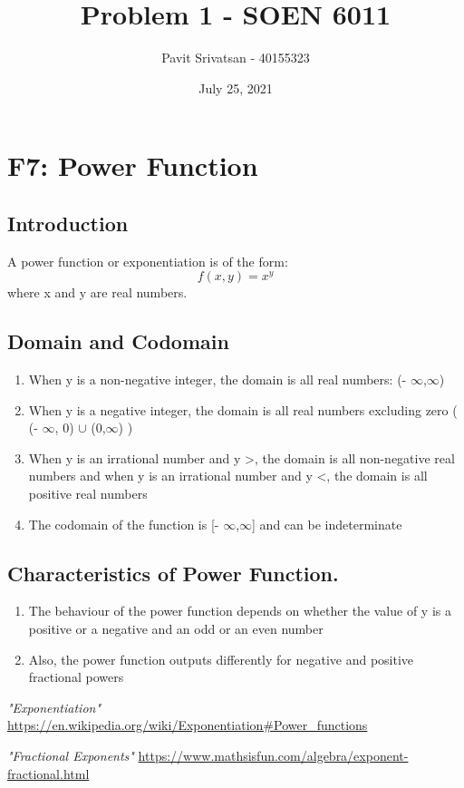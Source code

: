 \documentclass{article}
\title{Problem 1 - SOEN 6011}
\author{Pavit Srivatsan - 40155323}
\date{July 25, 2021}
\begin{document}
\maketitle

\section*{F7: Power Function}
\subsection{Introduction}
A power function or exponentiation is of the form:\[ f(x,y) = x^y \] where x and y are real numbers.
\subsection{Domain and Codomain}
\begin{enumerate}
\item When y is a non-negative integer, the domain is all real numbers:  (- $\infty$,$\infty$)

\item When y is a negative integer, the domain is all real numbers excluding zero ( (- $\infty$, 0) $\cup$ (0,$\infty$) )

\item When y is an irrational number and y \textgreater {}, the domain is all non-negative real numbers and when y is an irrational number and y \textless {}, the domain is all positive real numbers

\item The codomain of the function is [- $\infty$,$\infty$] and can be indeterminate
\end{enumerate}


\subsection{Characteristics of Power Function.}
\begin{enumerate}
\item The behaviour of the power function depends on whether the value of y is a positive or a negative and  an odd or an even number
\item Also, the power function outputs differently for negative and positive fractional powers
\end{enumerate}
\begin{thebibliography}{9}
	 \emph{"Exponentiation"} \url{https://en.wikipedia.org/wiki/Exponentiation#Power_functions}
    
     \emph{"Fractional Exponents"} \url{https://www.mathsisfun.com/algebra/exponent-fractional.html}
	
	
\end{thebibliography}
\end{document}
